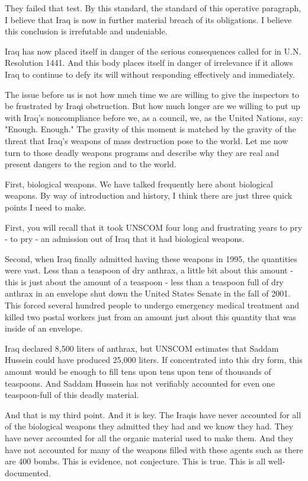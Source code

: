 \documentclass[10pt,a4paper]{article}
\begin{document}
They failed that test. By this standard, the standard of this operative paragraph, I believe that Iraq is now in further material breach of its obligations. I believe this conclusion is irrefutable and undeniable.

Iraq has now placed itself in danger of the serious consequences called for in U.N. Resolution 1441. And this body places itself in danger of irrelevance if it allows Iraq to continue to defy its will without responding effectively and immediately.

The issue before us is not how much time we are willing to give the inspectors to be frustrated by Iraqi obstruction. But how much longer are we willing to put up with Iraq's noncompliance before we, as a council, we, as the United Nations, say: "Enough. Enough." The gravity of this moment is matched by the gravity of the threat that Iraq's weapons of mass destruction pose to the world. Let me now turn to those deadly weapons programs and describe why they are real and present dangers to the region and to the world.

First, biological weapons. We have talked frequently here about biological weapons. By way of introduction and history, I think there are just three quick points I need to make.

First, you will recall that it took UNSCOM four long and frustrating years to pry - to pry - an admission out of Iraq that it had biological weapons.

Second, when Iraq finally admitted having these weapons in 1995, the quantities were vast. Less than a teaspoon of dry anthrax, a little bit about this amount - this is just about the amount of a teaspoon - less than a teaspoon full of dry anthrax in an envelope shut down the United States Senate in the fall of 2001. This forced several hundred people to undergo emergency medical treatment and killed two postal workers just from an amount just about this quantity that was inside of an envelope.

Iraq declared 8,500 liters of anthrax, but UNSCOM estimates that Saddam Hussein could have produced 25,000 liters. If concentrated into this dry form, this amount would be enough to fill tens upon tens upon tens of thousands of teaspoons. And Saddam Hussein has not verifiably accounted for even one teaspoon-full of this deadly material.

And that is my third point. And it is key. The Iraqis have never accounted for all of the biological weapons they admitted they had and we know they had. They have never accounted for all the organic material used to make them. And they have not accounted for many of the weapons filled with these agents such as there are 400 bombs. This is evidence, not conjecture. This is true. This is all well-documented.
\end{document}

